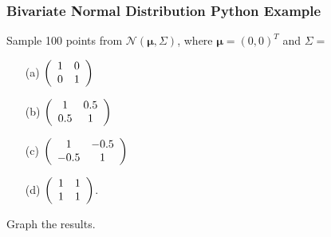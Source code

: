 \documentclass{beamer}
\begin{document}
\begin{frame}
\frametitle{Bivariate Normal Distribution Python Example}
\small
\begin{Example}
Sample 100 points from $\mathcal{N}\left( {\boldsymbol \mu}, \Sigma\right)$, where $ {\boldsymbol \mu} = (0, 0)^T$ and $\Sigma = $
\begin{multicols}{2}
\begin{enumerate}
\item[(a)] $\left(\begin{array}{c c} 1	&	0\\ 0	&	1\end{array}\right)$
\item[(b)] $\left(\begin{array}{c c} 1	&	0.5\\ 0.5	&	1\end{array}\right)$
\item[(c)] $\left(\begin{array}{c c} 1	&	-0.5\\ -0.5	&	1\end{array}\right)$
\item[(d)] $\left(\begin{array}{c c} 1	&	1\\ 1	&	1\end{array}\right)$.
\end{enumerate}
\end{multicols}
Graph the results.
\end{Example}


\end{frame}
\end{document}

